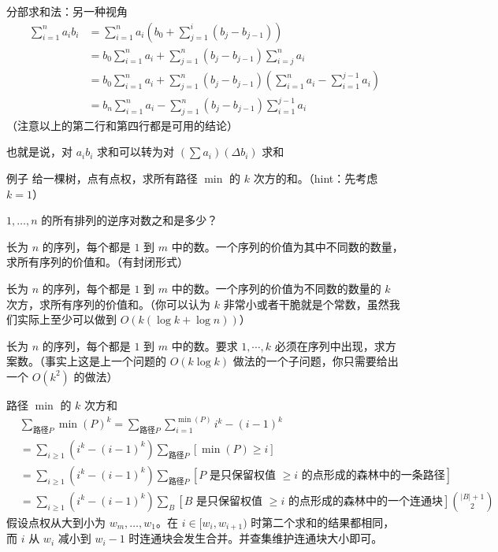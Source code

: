 \begin{frame}{分部求和法：另一种视角}
    $$
    \begin{aligned}
    \sum_{i=1}^na_ib_i&=\sum_{i=1}^na_i\left(b_0+\sum_{j=1}^i(b_j-b_{j-1})\right)\\
    &=b_0\sum_{i=1}^na_i+\sum_{j=1}^n(b_j-b_{j-1})\sum_{i=j}^n a_i\\
    &=b_0\sum_{i=1}^na_i+\sum_{j=1}^n(b_j-b_{j-1})\left(\sum_{i=1}^na_i-\sum_{i=1}^{j-1}a_i\right)\\
    &=b_n\sum_{i=1}^na_i-\sum_{j=1}^n(b_j-b_{j-1})\sum_{i=1}^{j-1}a_i
    \end{aligned}
    $$
    （注意以上的第二行和第四行都是可用的结论）

    也就是说，对 $a_ib_i$ 求和可以转为对 $(\sum a_i)(\Delta b_i)$ 求和
\end{frame}
\begin{frame}{例子}
    给一棵树，点有点权，求所有路径 $\min$ 的 $k$ 次方的和。（hint：先考虑 $k=1$）

    $1,\ldots,n$ 的所有排列的逆序对数之和是多少？

    长为 $n$ 的序列，每个都是 $1$ 到 $m$ 中的数。一个序列的价值为其中不同数的数量，求所有序列的价值和。（有封闭形式）

    长为 $n$ 的序列，每个都是 $1$ 到 $m$ 中的数。一个序列的价值为不同数的数量的 $k$ 次方，求所有序列的价值和。（你可以认为 $k$ 非常小或者干脆就是个常数，虽然我们实际上至少可以做到 $O(k(\log k+\log n))$） 

    长为 $n$ 的序列，每个都是 $1$ 到 $m$ 中的数。要求 $1,\cdots,k$ 必须在序列中出现，求方案数。（事实上这是上一个问题的 $O(k\log k)$ 做法的一个子问题，你只需要给出一个 $O(k^2)$ 的做法）
\end{frame}
\begin{frame}{路径 $\min$ 的 $k$ 次方和}
    $$
    \begin{aligned}
        &\sum_{\text{路径}P}\min(P)^k=\sum_{\text{路径}P}\sum_{i=1}^{\min(P)}i^k-(i-1)^k\\
        &=\sum_{i\ge 1}(i^k-(i-1)^k)\sum_{\text{路径}P}[\min(P)\ge i]\\
        &=\sum_{i\ge 1}(i^k-(i-1)^k)\sum_{\text{路径}P}[P\text{ 是只保留权值 }\ge i \text{ 的点形成的森林中的一条路径}]\\
        &=\sum_{i\ge 1}(i^k-(i-1)^k)\sum_{B}[B\text{ 是只保留权值 }\ge i\text{ 的点形成的森林中的一个连通块}]\binom{|B|+1}{2}
    \end{aligned}
    $$
    假设点权从大到小为 $w_m,\ldots,w_1$。在 $i\in [w_i,w_{i+1})$ 时第二个求和的结果都相同，而 $i$ 从 $w_i$ 减小到 $w_i-1$ 时连通块会发生合并。并查集维护连通块大小即可。
\end{frame}

